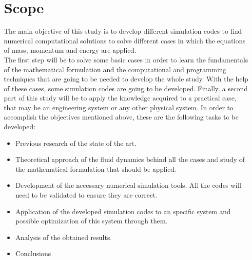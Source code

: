 

\section{Scope}
The main objective of this study is to develop different simulation codes to find numerical computational solutions to solve different cases in which the equations of mass, momentum and energy are applied.
\\
The first step will be to solve some basic cases in order to learn the fundamentals of the mathematical formulation and the computational and programming techniques that are going to be needed to develop the whole study. With the help of these cases, some simulation codes are going to be developed.
\newline
Finally, a second part of this study will be to apply the knowledge acquired to a practical case, that may be an engineering system or any other physical system.
\newline
\newline
In order to accomplish the objectives mentioned above, these are the following tasks to be developed:
\begin{itemize}
	\item Previous research of the state of the art.
	\item Theoretical approach of the fluid dynamics behind all the cases and study of the mathematical formulation that should be applied.
	\item Development of the necessary numerical simulation tools. All the codes will need to be validated to ensure they are correct.
	\item Application of the developed simulation codes to an specific system and possible optimization of this system through them.
	\item Analysis of the obtained results.
	\item Conclusions
\end{itemize}
